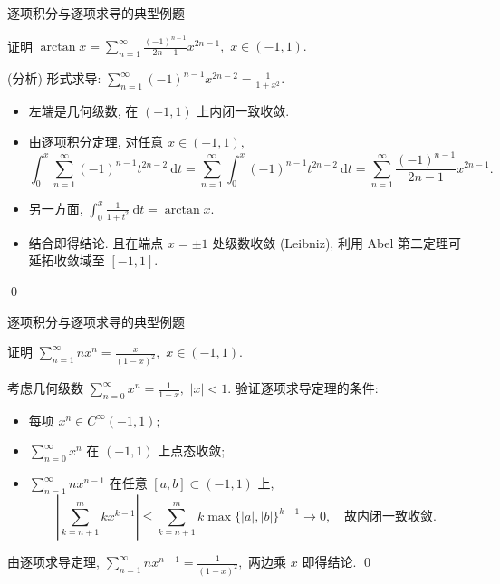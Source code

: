 
\begin{frame}{逐项积分与逐项求导的典型例题}

\begin{eg}[逐项积分]
证明 $\arctan x = \sum_{n=1}^\infty \frac{(-1)^{n-1}}{2n-1} x^{2n-1},$ $x \in (-1, 1).$
\end{eg}

\pause
\vspace{0.5em}

\startproof[bg=yellow, fg=red](分析)
形式求导: $\sum_{n=1}^\infty (-1)^{n-1} x^{2n-2} = \frac{1}{1+x^2}.$
\begin{itemize}[<+->]
\item 左端是几何级数, 在 $(-1, 1)$ 上内闭一致收敛.
\item 由逐项积分定理, 对任意 $x \in (-1, 1),$
\[\int_0^x \sum_{n=1}^\infty (-1)^{n-1} t^{2n-2} ~ \mathrm{d}t = \sum_{n=1}^\infty \int_0^x (-1)^{n-1} t^{2n-2} ~ \mathrm{d}t = \sum_{n=1}^\infty \frac{(-1)^{n-1}}{2n-1} x^{2n-1}.\]
\item 另一方面, $\int_0^x \frac{1}{1+t^2} ~ \mathrm{d}t = \arctan x.$
\item 结合即得结论. 且在端点 $x = \pm 1$ 处级数收敛 (Leibniz), 利用 Abel 第二定理可延拓收敛域至 $[-1, 1].$
\end{itemize}
\qed

\end{frame}


\begin{frame}{逐项积分与逐项求导的典型例题}

\begin{eg}[逐项求导]
证明 $\sum_{n=1}^\infty n x^n = \frac{x}{(1-x)^2},$ $x \in (-1, 1).$
\end{eg}

\pause
\vspace{0.5em}

\startproof[bg=yellow, fg=red]
考虑几何级数 $\sum_{n=0}^\infty x^n = \frac{1}{1-x},$ $|x| < 1.$
\pause
验证逐项求导定理的条件:
\begin{itemize}
\item 每项 $x^n \in C^\infty(-1, 1);$
\pause
\item $\sum_{n=0}^\infty x^n$ 在 $(-1, 1)$ 上点态收敛;
\pause
\item $\sum_{n=1}^\infty n x^{n-1}$ 在任意 $[a,b] \subset (-1,1)$ 上,
\[
\left\lvert \sum_{k=n+1}^m k x^{k-1} \right\rvert \leqslant \sum_{k=n+1}^m k \max\{|a|,|b|\}^{k-1} \to 0,
\quad \text{故内闭一致收敛.}
\]
\end{itemize}
\pause
由逐项求导定理, $\sum_{n=1}^\infty n x^{n-1} = \frac{1}{(1-x)^2},$ 两边乘 $x$ 即得结论.
\qed

\end{frame}

